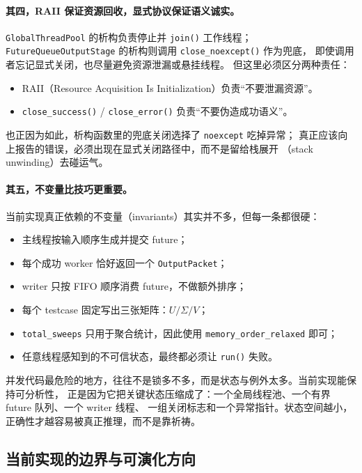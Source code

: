 \paragraph{其四，RAII 保证资源回收，显式协议保证语义诚实。}
\texttt{GlobalThreadPool} 的析构负责停止并 \texttt{join()} 工作线程；
\texttt{FutureQueueOutputStage} 的析构则调用 \texttt{close\_noexcept()} 作为兜底，
即使调用者忘记显式关闭，也尽量避免资源泄漏或悬挂线程。
但这里必须区分两种责任：

\begin{itemize}
    \item RAII（Resource Acquisition Is Initialization）负责“不要泄漏资源”。
    \item \texttt{close\_success()} / \texttt{close\_error()} 负责“不要伪造成功语义”。
\end{itemize}

也正因为如此，析构函数里的兜底关闭选择了 \texttt{noexcept} 吃掉异常；
真正应该向上报告的错误，必须出现在显式关闭路径中，而不是留给栈展开
（stack unwinding）去碰运气。

\paragraph{其五，不变量比技巧更重要。}
当前实现真正依赖的不变量（invariants）其实并不多，但每一条都很硬：

\begin{itemize}
    \item 主线程按输入顺序生成并提交 future；
    \item 每个成功 worker 恰好返回一个 \texttt{OutputPacket}；
    \item writer 只按 FIFO 顺序消费 future，不做额外排序；
    \item 每个 testcase 固定写出三张矩阵：$U/\Sigma/V$；
    \item \texttt{total\_sweeps} 只用于聚合统计，因此使用 \texttt{memory\_order\_relaxed} 即可；
    \item 任意线程感知到的不可信状态，最终都必须让 \texttt{run()} 失败。
\end{itemize}

并发代码最危险的地方，往往不是锁多不多，而是状态与例外太多。当前实现能保持可分析性，
正是因为它把关键状态压缩成了：一个全局线程池、一个有界 future 队列、一个 writer 线程、
一组关闭标志和一个异常指针。状态空间越小，正确性才越容易被真正推理，而不是靠祈祷。

\subsection{当前实现的边界与可演化方向}

